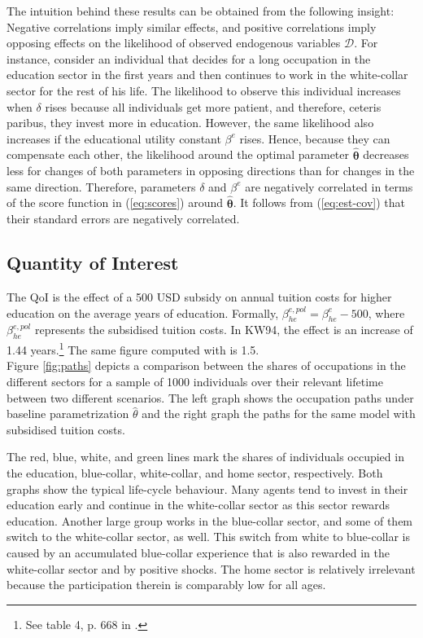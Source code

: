 \noindent
The intuition behind these results can be obtained from the following insight: Negative correlations imply similar effects, and positive correlations imply opposing effects on the likelihood of observed endogenous variables $\pmb{\mathcal{D}}$. For instance, consider an individual that decides for a long occupation in the education sector in the first years and then continues to work in the white-collar sector for the rest of his life. The likelihood to observe this individual increases when $\delta$ rises because all individuals get more patient, and therefore, ceteris paribus, they invest more in education. However, the same likelihood also increases if the educational utility constant $\beta^e$ rises. Hence, because they can compensate each other, the likelihood around the optimal parameter $\pmb{\hat{\theta}}$ decreases less for changes of both parameters in opposing directions than for changes in the same direction. Therefore, parameters $\delta$ and $\beta^e$ are negatively correlated in terms of the score function in (\ref{eq:scores}) around $\pmb{\hat{\theta}}$. It follows from (\ref{eq:est-cov}) that their standard errors are negatively correlated.


\subsection{Quantity of Interest}

The QoI is the effect of a 500 USD subsidy on annual tuition costs for higher education on the average years of education. Formally, $\beta_{he}^{e,pol} = \beta_{he}^e - 500$, where $\beta_{he}^{e,pol}$ represents the subsidised tuition costs. In KW94, the effect is an increase of 1.44 years.\footnote{See table 4, p. 668 in \cite{Keane.1994}.} The same figure computed with  is 1.5.\\
\newline
Figure \ref{fig:paths} depicts a comparison between the shares of occupations in the different sectors for a sample of 1000 individuals over their relevant lifetime between two different scenarios. The left graph shows the occupation paths under baseline parametrization $\hat{\theta}$ and the right graph the paths for the same model with subsidised tuition costs.

The red, blue, white, and green lines mark the shares of individuals occupied in the education, blue-collar, white-collar, and home sector, respectively. Both graphs show the typical life-cycle behaviour. Many agents tend to invest in their education early and continue in the white-collar sector as this sector rewards education. Another large group works in the blue-collar sector, and some of them switch to the white-collar sector, as well. This switch from white to blue-collar is caused by an accumulated blue-collar experience that is also rewarded in the white-collar sector and by positive shocks. The home sector is relatively irrelevant because the participation therein is comparably low for all ages.\\

